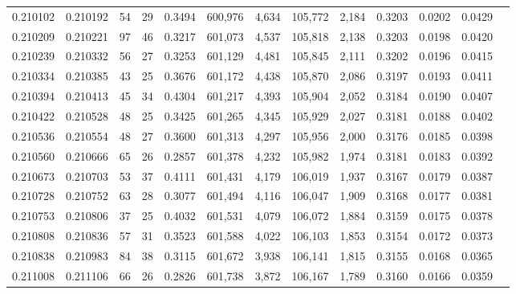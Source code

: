 \begin{tabular}{rrrrrrrrrrrrr}
0.210102 & 0.210192 &    54 &  29 &                                     0.3494 & 600,976 &   4,634 & 105,772 &   2,184 & 0.3203 & 0.0202 & 0.0429 \\
0.210209 & 0.210221 &    97 &  46 &                                     0.3217 & 601,073 &   4,537 & 105,818 &   2,138 & 0.3203 & 0.0198 & 0.0420 \\
0.210239 & 0.210332 &    56 &  27 &                                     0.3253 & 601,129 &   4,481 & 105,845 &   2,111 & 0.3202 & 0.0196 & 0.0415 \\
0.210334 & 0.210385 &    43 &  25 &                                     0.3676 & 601,172 &   4,438 & 105,870 &   2,086 & 0.3197 & 0.0193 & 0.0411 \\
0.210394 & 0.210413 &    45 &  34 &                                     0.4304 & 601,217 &   4,393 & 105,904 &   2,052 & 0.3184 & 0.0190 & 0.0407 \\
0.210422 & 0.210528 &    48 &  25 &                                     0.3425 & 601,265 &   4,345 & 105,929 &   2,027 & 0.3181 & 0.0188 & 0.0402 \\
0.210536 & 0.210554 &    48 &  27 &                                     0.3600 & 601,313 &   4,297 & 105,956 &   2,000 & 0.3176 & 0.0185 & 0.0398 \\
0.210560 & 0.210666 &    65 &  26 &                                     0.2857 & 601,378 &   4,232 & 105,982 &   1,974 & 0.3181 & 0.0183 & 0.0392 \\
0.210673 & 0.210703 &    53 &  37 &                                     0.4111 & 601,431 &   4,179 & 106,019 &   1,937 & 0.3167 & 0.0179 & 0.0387 \\
0.210728 & 0.210752 &    63 &  28 &                                     0.3077 & 601,494 &   4,116 & 106,047 &   1,909 & 0.3168 & 0.0177 & 0.0381 \\
0.210753 & 0.210806 &    37 &  25 &                                     0.4032 & 601,531 &   4,079 & 106,072 &   1,884 & 0.3159 & 0.0175 & 0.0378 \\
0.210808 & 0.210836 &    57 &  31 &                                     0.3523 & 601,588 &   4,022 & 106,103 &   1,853 & 0.3154 & 0.0172 & 0.0373 \\
0.210838 & 0.210983 &    84 &  38 &                                     0.3115 & 601,672 &   3,938 & 106,141 &   1,815 & 0.3155 & 0.0168 & 0.0365 \\
0.211008 & 0.211106 &    66 &  26 &                                     0.2826 & 601,738 &   3,872 & 106,167 &   1,789 & 0.3160 & 0.0166 & 0.0359 \\

\end{tabular}
